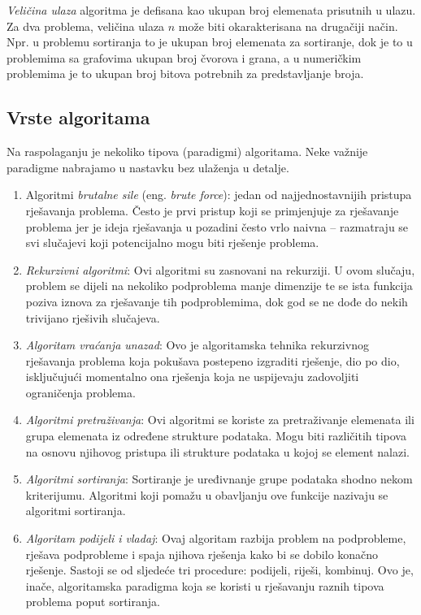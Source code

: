 \textit{Veličina ulaza} algoritma je defisana kao ukupan broj elemenata prisutnih u ulazu. Za dva problema, veličina ulaza $n$ može biti okarakterisana na drugačiji način.  Npr.  u problemu sortiranja to  je ukupan broj elemenata za sortiranje, dok je to  u problemima sa grafovima  ukupan broj čvorova i grana, a  u numeričkim problemima je to ukupan broj bitova potrebnih za predstavljanje broja. 

 \subsection{Vrste algoritama}
Na raspolaganju je nekoliko tipova (paradigmi) algoritama. Neke važnije paradigme nabrajamo u nastavku bez ulaženja u detalje. 
\begin{enumerate}
	\item Algoritmi \textit{brutalne sile} (eng. \textit{brute force}): jedan od najjednostavnijih pristupa rješavanja problema. Često je prvi pristup koji se primjenjuje za  rješavanje problema jer je ideja rješavanja u pozadini često vrlo naivna -- razmatraju se svi slučajevi koji  potencijalno mogu biti rješenje problema.
	\item \textit{Rekurzivni algoritmi}: Ovi algoritmi su zasnovani na rekurziji. U ovom slučaju, problem se dijeli na nekoliko podproblema manje dimenzije te  se ista funkcija poziva iznova za rješavanje tih podproblemima, dok god se ne dođe do nekih trivijano rješivih slučajeva.
	\item \textit{Algoritam vraćanja unazad}: Ovo je algoritamska tehnika rekurzivnog rješavanja problema koja pokušava postepeno izgraditi rješenje, dio po dio, isključujući momentalno ona rješenja koja ne uspijevaju zadovoljiti ograničenja problema. 
	\item  \textit{Algoritmi pretraživanja}:  Ovi algoritmi se koriste za pretraživanje elemenata ili grupa elemenata iz određene strukture podataka. Mogu biti različitih tipova na osnovu njihovog pristupa ili strukture podataka u kojoj se element nalazi.
	\item \textit{Algoritmi sortiranja}: Sortiranje je uređivnanje grupe podataka  shodno nekom kriterijumu. Algoritmi koji pomažu u obavljanju ove funkcije nazivaju se algoritmi sortiranja. %
	\item \textit{Algoritam podijeli i vladaj}: Ovaj algoritam razbija problem na podpro\-bleme, rješava podprobleme i spaja njihova rješenja kako bi se dobilo konačno rješenje. Sastoji se od sljedeće tri procedure:
    podijeli, riješi, kombinuj. Ovo je, inače, algoritamska paradigma koja se koristi u rješavanju raznih tipova problema poput sortiranja.
  

\end{enumerate}
